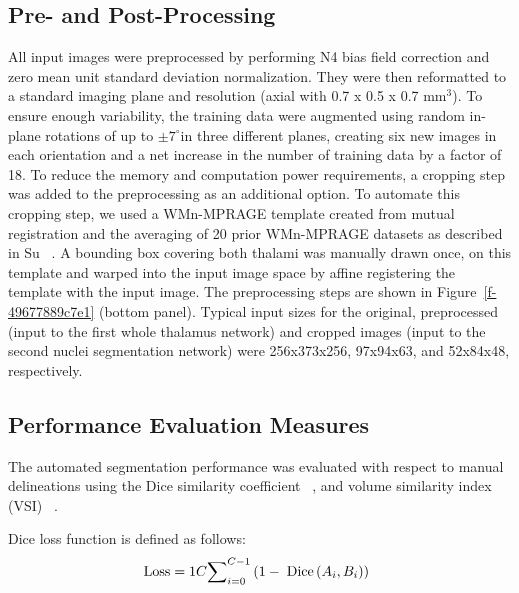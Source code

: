 \documentclass[3p,,final,12pt]{elsarticle}
\begin{document}
\subsection{Pre- and Post-Processing}All input images were preprocessed by performing N4 bias field correction and zero mean unit standard deviation normalization. They were then reformatted to a standard imaging plane and resolution (axial with 0.7 x 0.5 x 0.7 mm\ensuremath{^{3}}). To ensure enough variability, the training data were augmented using random in-plane rotations of up to $\pm7^\circ $in three different planes, creating six new images in each orientation and a net increase in the number of training data by a factor of 18. To reduce the memory and computation power requirements, a cropping step was added to the preprocessing as an additional option. To automate this cropping step, we used a WMn-MPRAGE template created from mutual registration and the averaging of 20 prior WMn-MPRAGE datasets as described in Su \unskip~\cite{1643371:26789960}. A bounding box covering both thalami was manually drawn once, on this template and warped into the input image space by affine registering the template with the input image. The preprocessing steps are shown in Figure~\ref{f-49677889c7e1}  (bottom panel). Typical input sizes for the original, preprocessed (input to the first whole thalamus network) and cropped images (input to the second nuclei segmentation network) were 256x373x256, 97x94x63, and 52x84x48, respectively.



\subsection{Performance Evaluation Measures}The automated segmentation performance was evaluated with respect to manual delineations using the Dice similarity coefficient \unskip~\cite{1643371:26789928}, and volume similarity index (VSI) \unskip~\cite{1643371:26789960}. 

Dice loss function is defined as follows:
\let\saveeqnno\theequation
\let\savefrac\frac
\def\dispfrac{\displaystyle\savefrac}
\begin{eqnarray}
\let\frac\dispfrac
\gdef\theequation{1}
\let\theHequation\theequation
\label{disp-formula-group-f73e8e30e04042bea52de88dd1c0e353}
\begin{array}{@{}l}\text{Loss}=\frac1C{\sum\nolimits_{i=0}^{C-1}{(1-\;\text{Dice}\left(A_i,B_i)\right)}}\end{array}
\end{eqnarray}
\global\let\theequation\saveeqnno
\addtocounter{equation}{-1}\ignorespaces 
\end{document}
